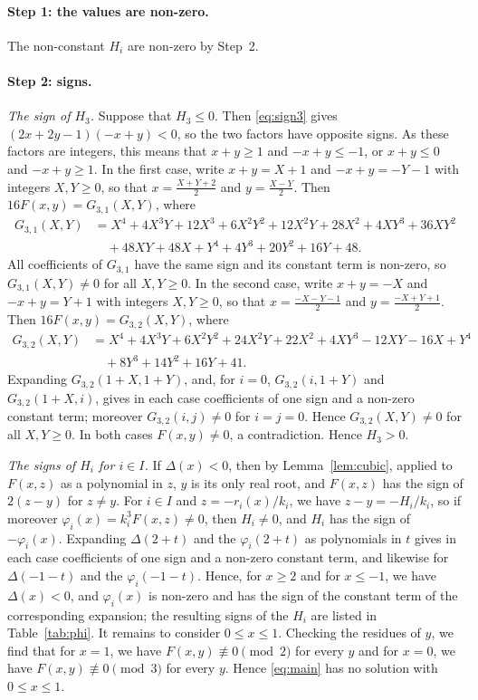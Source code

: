\documentclass[11pt]{article}
\begin{document}
\paragraph{Step 1: the values are non-zero.} The non-constant $H_i$ are non-zero by Step~2.

\paragraph{Step 2: signs.} \emph{The sign of $H_{3}$.} Suppose that $H_{3}\leq0$. Then \eqref{eq:sign3} gives $(2x+2y-1)(-x+y)<0$, so the two factors have opposite signs. As these factors are integers, this means that $x+y\geq1$ and $-x+y\leq-1$, or $x+y\leq0$ and $-x+y\geq1$. In the first case, write $x+y=X+1$ and $-x+y=-Y-1$ with integers $X,Y\geq0$, so that $x=\tfrac{X+Y+2}{2}$ and $y=\tfrac{X-Y}{2}$. Then $16F(x,y)=G_{3,1}(X,Y)$, where
\begin{align*}
G_{3,1}(X,Y)&=X^{4}+4X^{3}Y+12X^{3}+6X^{2}Y^{2}+12X^{2}Y+28X^{2}+4XY^{3}+36XY^{2}\\
&\quad+48XY+48X+Y^{4}+4Y^{3}+20Y^{2}+16Y+48.
\end{align*}
All coefficients of $G_{3,1}$ have the same sign and its constant term is non-zero, so $G_{3,1}(X,Y)\neq0$ for all $X,Y\geq0$. In the second case, write $x+y=-X$ and $-x+y=Y+1$ with integers $X,Y\geq0$, so that $x=\tfrac{-X-Y-1}{2}$ and $y=\tfrac{-X+Y+1}{2}$. Then $16F(x,y)=G_{3,2}(X,Y)$, where
\begin{align*}
G_{3,2}(X,Y)&=X^{4}+4X^{3}Y+6X^{2}Y^{2}+24X^{2}Y+22X^{2}+4XY^{3}-12XY-16X+Y^{4}\\
&\quad+8Y^{3}+14Y^{2}+16Y+41.
\end{align*}
Expanding $G_{3,2}(1+X,1+Y)$, and, for $i=0$, $G_{3,2}(i,1+Y)$ and $G_{3,2}(1+X,i)$, gives in each case coefficients of one sign and a non-zero constant term; moreover $G_{3,2}(i,j)\neq0$ for $i=j=0$. Hence $G_{3,2}(X,Y)\neq0$ for all $X,Y\geq0$. In both cases $F(x,y)\neq0$, a contradiction. Hence $H_{3}>0$.

\emph{The signs of $H_i$ for $i\in I$.} If $\Delta(x)<0$, then by Lemma~\ref{lem:cubic}, applied to $F(x,z)$ as a polynomial in $z$, $y$ is its only real root, and $F(x,z)$ has the sign of $2(z-y)$ for $z\neq y$. For $i\in I$ and $z=-r_i(x)/k_i$, we have $z-y=-H_i/k_i$, so if moreover $\varphi_i(x)=k_i^3F(x,z)\neq0$, then $H_i\neq0$, and $H_i$ has the sign of $-\varphi_i(x)$. Expanding $\Delta(2+t)$ and the $\varphi_i(2+t)$ as polynomials in $t$ gives in each case coefficients of one sign and a non-zero constant term, and likewise for $\Delta(-1-t)$ and the $\varphi_i(-1-t)$. Hence, for $x\geq2$ and for $x\leq-1$, we have $\Delta(x)<0$, and $\varphi_i(x)$ is non-zero and has the sign of the constant term of the corresponding expansion; the resulting signs of the $H_i$ are listed in Table~\ref{tab:phi}. It remains to consider $0\leq x\leq1$. Checking the residues of $y$, we find that for $x=1$, we have $F(x,y)\not\equiv0\pmod{2}$ for every $y$ and for $x=0$, we have $F(x,y)\not\equiv0\pmod{3}$ for every $y$. Hence \eqref{eq:main} has no solution with $0\leq x\leq1$.
\end{document}
